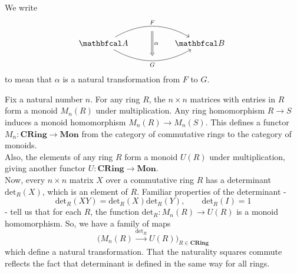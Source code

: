 \documentclass[11pt,a4paper]{article}
\begin{document}
We write
\begin{equation*}
\begin{tikzcd}
    \cat{A} \arrow[rr, bend left=30, "F"{name=F}]
    \arrow[rr, bend right=30, "G"'{name=G}]
    && \cat{B} \
    \arrow[from=F, Rightarrow, to=G, "\alpha", shorten <= 6pt, shorten >= 6pt]
\end{tikzcd}
\end{equation*}
to mean that $\alpha$ is a natural transformation from $F$ to $G$.

\begin{example}
    Fix a natural number $n$. For any ring $R$, the $n\times n$ matrices with entries in $R$ form a monoid $M_n(R)$ under multiplication. Any ring homomorphism $R\to S$ induces a monoid homomorphism $M_n(R)\to M_n(S)$. This defines a functor $M_n: \textbf{CRing} \to \textbf{Mon}$ from the category of commutative rings to the category of monoids.\\
    Also, the elements of any ring $R$ form a monoid $U(R)$ under multiplication, giving another functor $U: \textbf{CRing}\to \textbf{Mon}$.\\
    Now, every $n\times n$ matrix $X$ over a commutative ring $R$ has a determinant $\text{det}_R(X)$, which is an element of $R$. Familiar properties of the determinant -
    \begin{equation*}
        \text{det}_R(XY)=\text{det}_R(X)\text{det}_R(Y),\qquad \text{det}_R(I)=1
    \end{equation*}
    - tell us that for each $R$, the function $\text{det}_R:M_n(R)\to U(R)$ is a monoid homomorphism. So, we have a family of maps
    $$\big(M_n(R) \xrightarrow{\text{det}_R} U(R)\big)_{R\in \textbf{CRing}}$$
    which define a natural transformation. That the naturality squares commute reflects the fact that determinant is defined in the same way for all rings.
\end{example}
\end{document}
